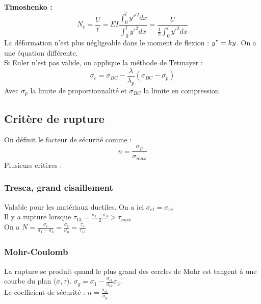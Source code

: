 \documentclass[../main.tex]{subfiles}
\begin{document}
\textbf{Timoshenko :}\\
\begin{equation}
    N_c = \frac{U}{t} = EI\frac{\int_0^l y''^2dx}{\int_0^l y'^2dx} = \frac{U}{\frac{1}{2} \int_0^ly'^2dx}
\end{equation}
La déformation n'est plus négligeable dans le moment de flexion : $y"=ky$. On a une équation différente.\\

Si Euler n'est pas valide, on applique la méthode de Tetmayer : \\
\begin{equation}
    \sigma_c = \sigma_{BC} - \frac{\lambda}{\lambda_p}(\sigma_{BC}-\sigma_p)
\end{equation}
Avec $\sigma_p$ la limite de proportionnalité et $\sigma_{BC}$ la limite en compression.\\

\subsection{Critère de rupture}
On définit le facteur de sécurité comme : \\
\begin{equation}
    n = \frac{\sigma_p}{\sigma_{max}}
\end{equation}
Plusieurs critères : \\
\subsubsection{Tresca, grand cisaillement}
Valable pour les matériaux ductiles. On a ici $\sigma_{et} = \sigma_{ec}$\\
Il y a rupture lorsque $\tau_{13} = \frac{\sigma_1-\sigma_3}{2} > \tau_{max}$\\
On a $N = \frac{\sigma_e}{\sigma_1-\sigma_3} = \frac{\sigma_e}{\sigma_g} = \frac{\tau_e}{\tau_{13}}$\\

\subsubsection{Mohr-Coulomb}
La rupture se produit quand le plus grand des cercles de Mohr est tangent à une courbe du plan ($\sigma, \tau$). $\sigma_g = \sigma_1-\frac{\sigma_{et}}{\sigma_{ec}}\sigma_3$. \\
Le coefficient de sécurité : $n = \frac{\sigma_{et}}{\sigma_g}$\\
\end{document}
